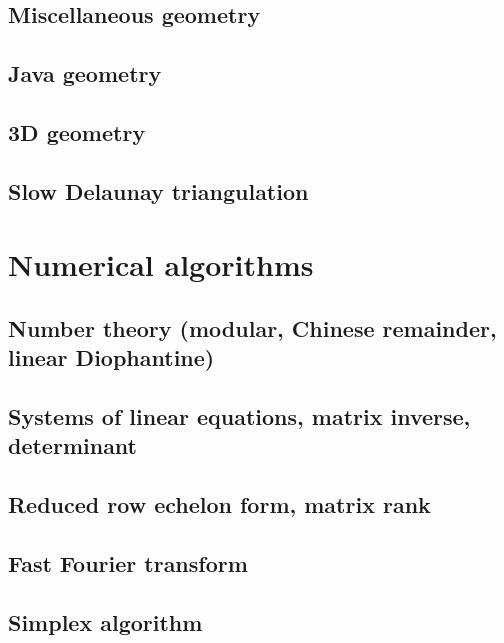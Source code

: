 \section{Miscellaneous geometry}
\raggedbottom
\hrulefill
\section{Java geometry}
\raggedbottom
\hrulefill
\section{3D geometry}
\raggedbottom
\hrulefill
\section{Slow Delaunay triangulation}
\raggedbottom
\hrulefill

\chapter{Numerical algorithms}
\section{Number theory (modular, Chinese remainder, linear Diophantine)}
\raggedbottom
\hrulefill
\section{Systems of linear equations, matrix inverse, determinant}
\raggedbottom
\hrulefill
\section{Reduced row echelon form, matrix rank}
\raggedbottom
\hrulefill
\section{Fast Fourier transform}
\raggedbottom
\hrulefill
\section{Simplex algorithm}
\raggedbottom
\hrulefill

